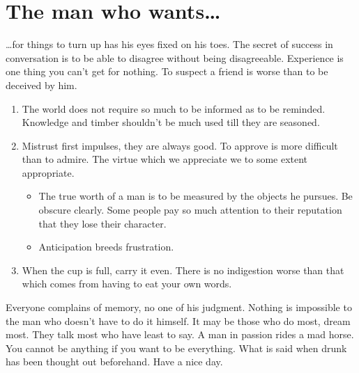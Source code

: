\section{The man who wants\ldots}
\ldots for things to turn up has his eyes fixed on his toes.  The
secret of success in conversation is to be able to disagree without
being disagreeable.  Experience is one thing you can't get for
nothing.  To suspect a friend is worse than to be deceived by him.
\begin{enumerate}
\item The world does not require so much to be informed as to be
  reminded. Knowledge and timber shouldn't be much used till they are
  seasoned.
\item Mistrust first impulses, they are always good.  To approve is
  more difficult than to admire.  The virtue which we appreciate we to
  some extent appropriate.
\begin{itemize}
\item The true worth of a man is to be measured by the objects he pursues.
Be obscure clearly.  Some people pay so much attention to their
reputation that they lose their character.  
\item Anticipation breeds frustration.
\end{itemize}
\item When the cup is full, carry it even.
There is no indigestion
worse than that which comes from having to eat your own words.
\end{enumerate}

Everyone complains of memory, no one of his judgment.  Nothing is
impossible to the man who doesn't have to do it himself.  It may be
those who do most, dream most.  They talk most who have least to say.
A man in passion rides a mad horse.  You cannot be anything if you
want to be everything.  What is said when drunk has been thought out
beforehand.  Have a nice day.
